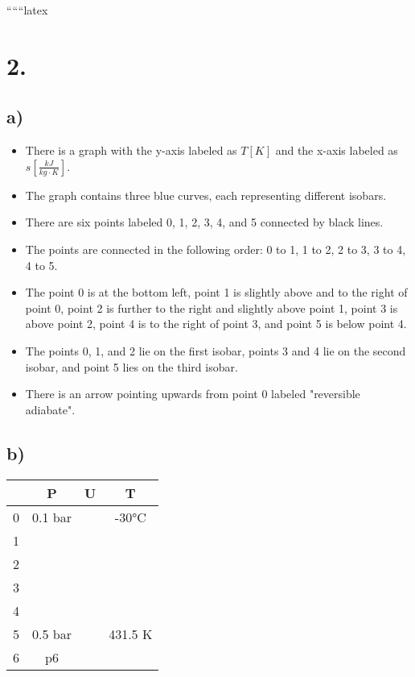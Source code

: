 
``````latex


\section*{2.}

\subsection*{a)}

\begin{itemize}
    \item There is a graph with the y-axis labeled as \( T [K] \) and the x-axis labeled as \( s \left[ \frac{kJ}{kg \cdot K} \right] \). 
    \item The graph contains three blue curves, each representing different isobars.
    \item There are six points labeled 0, 1, 2, 3, 4, and 5 connected by black lines.
    \item The points are connected in the following order: 0 to 1, 1 to 2, 2 to 3, 3 to 4, 4 to 5.
    \item The point 0 is at the bottom left, point 1 is slightly above and to the right of point 0, point 2 is further to the right and slightly above point 1, point 3 is above point 2, point 4 is to the right of point 3, and point 5 is below point 4.
    \item The points 0, 1, and 2 lie on the first isobar, points 3 and 4 lie on the second isobar, and point 5 lies on the third isobar.
    \item There is an arrow pointing upwards from point 0 labeled "reversible adiabate".
\end{itemize}

\subsection*{b)}

\begin{tabular}{|c|c|c|c|}
    \hline
    & P & U & T \\
    \hline
    0 & 0.1 bar & & -30°C \\
    \hline
    1 & & & \\
    \hline
    2 & & & \\
    \hline
    3 & & & \\
    \hline
    4 & & & \\
    \hline
    5 & 0.5 bar & & 431.5 K \\
    \hline
    6 & p6 & & \\
    \hline
\end{tabular}

